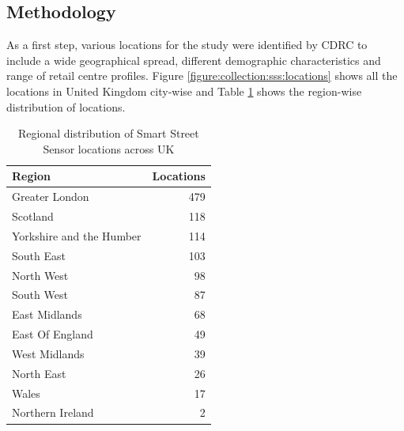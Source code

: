 \subsection{Methodology}
As a first step, various locations for the study were identified by CDRC to include a wide geographical spread, different demographic characteristics and range of retail centre profiles.
Figure \ref{figure:collection:sss:locations} shows all the locations in United Kingdom city-wise and Table \ref{table:collection:sss:locations} shows the region-wise distribution of locations.

\begin{table}
  \footnotesize
  \begin{center} 
    \begin{tabular}{lr} 
      \toprule
      Region & Locations \\
      \midrule
      Greater London & 479 \\
      Scotland & 118 \\
      Yorkshire and the Humber & 114 \\
      South East & 103 \\
      North West & 98 \\
      South West & 87 \\
      East Midlands & 68 \\
      East Of England & 49 \\
      West Midlands & 39 \\
      North East & 26 \\
      Wales & 17 \\
      Northern Ireland & 2 \\
      \bottomrule
    \end{tabular}
  \end{center}
  \caption{Regional distribution of Smart Street Sensor locations across UK}
  \label{table:collection:sss:locations}
\end{table}


